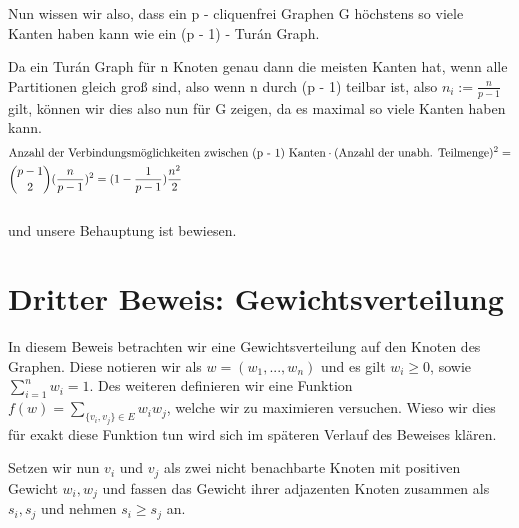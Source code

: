 \documentclass[12pt, a4paper]{article}
\begin{document}
Nun wissen wir also, dass ein p - cliquenfrei Graphen G höchstens so viele Kanten haben kann wie ein (p - 1) - Turán Graph.

Da ein Turán Graph für n Knoten genau dann die meisten Kanten hat, wenn alle Partitionen gleich groß sind, also wenn n durch (p - 1) teilbar ist, also $n_i := \frac{n}{p-1}$ gilt, können wir dies also nun für G zeigen, da es maximal so viele Kanten haben kann.
\begin{gather}
\begin{split}&\text{Anzahl der Verbindungsmöglichkeiten zwischen (p - 1) Kanten} \cdot ( \text{Anzahl der unabh. Teilmenge} )^2 = \\ &{ p - 1 \choose 2 } ( \frac{n}{p-1} )^2 = (1 - \frac{1}{p - 1}) \frac{n^2}{2}\end{split}\notag\\\begin{split}\end{split}\notag
\end{gather}
und unsere Behauptung ist bewiesen.


\section{Dritter Beweis: Gewichtsverteilung}
\label{proof/third::doc}\label{proof/third:dritter-beweis-gewichtsverteilung}
In diesem Beweis betrachten wir eine Gewichtsverteilung auf den Knoten des Graphen. Diese notieren wir als $w = (w_1,...,w_n)$ und es gilt $w_i \ge 0$, sowie $\sum^n_{i=1}w_i = 1$. Des weiteren definieren wir eine Funktion $f(w) = \sum_{ \{v_i, v_j\} \in E} w_i w_j$, welche wir zu maximieren versuchen. Wieso wir dies für exakt diese Funktion tun wird sich im späteren Verlauf des Beweises klären.

Setzen wir nun $v_i$ und $v_j$ als zwei nicht benachbarte Knoten mit positiven Gewicht $w_i, w_j$ und fassen das Gewicht ihrer adjazenten Knoten zusammen als $s_i, s_j$ und nehmen $s_i \ge s_j$ an.
\end{document}
